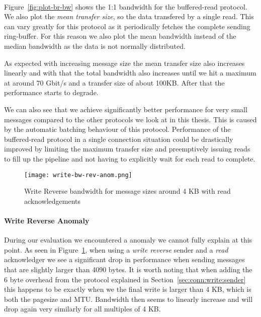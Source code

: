 \paragraph{} Figure~\ref{fig:plot-br-bw} shows the 1:1 bandwidth for the buffered-read protocol. We also plot the 
\emph{mean transfer size}, so the data transfered by a single read. This can vary greatly for this protocol as it periodically
fetches the complete sending ring-buffer. For this reason we also plot the mean bandwidth instead of the median bandwidth 
as the data is not normally distributed.

As expected with increasing message size the mean transfer size also increases linearly and with that the 
total bandwidth also increases until we hit a maximum at around 70 Gbit/s and a transfer size of about 100KB. After that 
the performance starts to degrade. 

We can also see that we achieve significantly better performance for very small messages compared to the other protocols we
look at in this thesis. This is caused by the automatic batching behaviour of this protocol. Performance of the buffered-read
protocol in a single connection situation could be drastically improved by limiting the maximum transfer size and 
preemptively issuing reads to fill up the pipeline and not having to explicitly wait for each
read to complete.


\begin{figure}[h]
\texttt{[image: write-bw-rev-anom.png]}
\caption{Write Reverse bandwidth for message sizes around 4 KB with read acknowledgements}
\label{fig:plot-write-rev-anom}
\end{figure}

\paragraph{Write Reverse Anomaly} During our evaluation we encountered a anomaly we cannot fully explain at
this point. As seen in Figure~\ref{fig:plot-write-rev-anom}, when using a \emph{write reverse} sender and a 
\emph{read} acknowledger we see a significant drop in performance when sending messages that are slightly larger
than 4090 bytes. It is worth noting that when adding the 6 byte overhead from the protocol explained in 
Section~\ref{sec:conn:write:sender} this happens to be exactly when we the final write is larger than 4 KB, 
which is both the pagesize and MTU. Bandwidth then seems to linearly increase and will drop again very similarly 
for all multiples of 4 KB.

